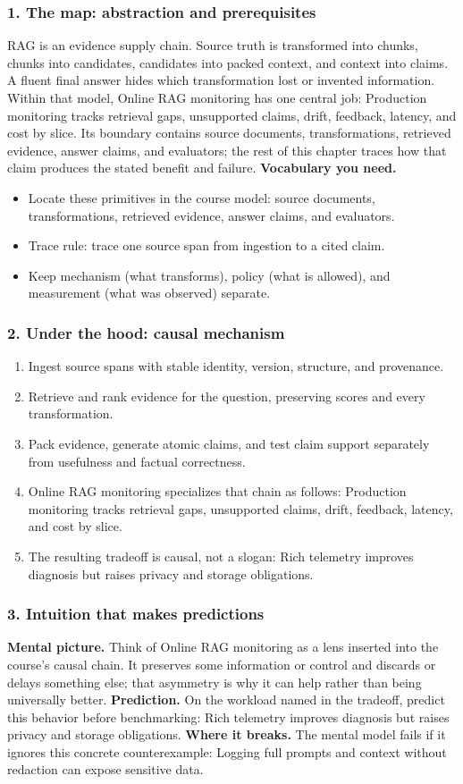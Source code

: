 \subsubsection*{1. The map: abstraction and prerequisites}
RAG is an evidence supply chain. Source truth is transformed into chunks, chunks into candidates, candidates into packed context, and context into claims. A fluent final answer hides which transformation lost or invented information.
Within that model, Online RAG monitoring has one central job: Production monitoring tracks retrieval gaps, unsupported claims, drift, feedback, latency, and cost by slice. Its boundary contains source documents, transformations, retrieved evidence, answer claims, and evaluators; the rest of this chapter traces how that claim produces the stated benefit and failure.
\textbf{Vocabulary you need.}\begin{itemize}
\item Locate these primitives in the course model: source documents, transformations, retrieved evidence, answer claims, and evaluators.
\item Trace rule: trace one source span from ingestion to a cited claim.
\item Keep mechanism (what transforms), policy (what is allowed), and measurement (what was observed) separate.
\end{itemize}
\subsubsection*{2. Under the hood: causal mechanism}\begin{enumerate}
\item Ingest source spans with stable identity, version, structure, and provenance.
\item Retrieve and rank evidence for the question, preserving scores and every transformation.
\item Pack evidence, generate atomic claims, and test claim support separately from usefulness and factual correctness.
\item Online RAG monitoring specializes that chain as follows: Production monitoring tracks retrieval gaps, unsupported claims, drift, feedback, latency, and cost by slice.
\item The resulting tradeoff is causal, not a slogan: Rich telemetry improves diagnosis but raises privacy and storage obligations.
\end{enumerate}
\subsubsection*{3. Intuition that makes predictions}
\textbf{Mental picture.} Think of Online RAG monitoring as a lens inserted into the course's causal chain. It preserves some information or control and discards or delays something else; that asymmetry is why it can help rather than being universally better.
\textbf{Prediction.} On the workload named in the tradeoff, predict this behavior before benchmarking: Rich telemetry improves diagnosis but raises privacy and storage obligations.
\textbf{Where it breaks.} The mental model fails if it ignores this concrete counterexample: Logging full prompts and context without redaction can expose sensitive data.
